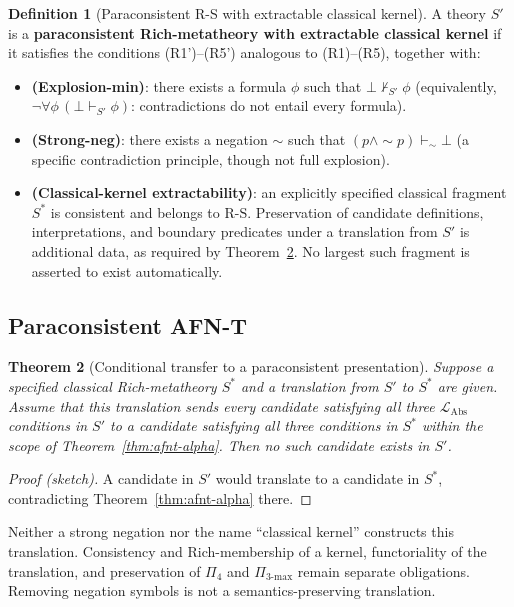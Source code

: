 \documentclass[11pt]{article}
\theoremstyle{plain}
\newtheorem{theorem}{Theorem}[section]
\theoremstyle{definition}
\newtheorem{definition}[theorem]{Definition}
\newcommand{\RS}{\mathrm{R\text{-}S}}
\newcommand{\LAbs}{\mathcal{L}_{\mathrm{Abs}}}
\begin{document}
\begin{definition}[Paraconsistent R-S with extractable classical kernel]\label{def:paraconsistent-rs}
A theory $S'$ is a \textbf{paraconsistent Rich-metatheory with extractable classical kernel} if it satisfies the conditions (R1')--(R5') analogous to (R1)--(R5), together with:
\begin{itemize}
\item \textbf{(Explosion-min)}: there exists a formula $\phi$ such that $\bot \not\vdash_{S'} \phi$ (equivalently, $\neg\forall\phi\,(\bot \vdash_{S'} \phi)$: contradictions do not entail every formula).
\item \textbf{(Strong-neg)}: there exists a negation $\sim$ such that $(p \wedge \sim p) \vdash_\sim \bot$ (a specific contradiction principle, though not full explosion).
\item \textbf{(Classical-kernel extractability)}: an explicitly specified classical fragment $S^*$ is consistent and belongs to $\RS$. Preservation of candidate definitions, interpretations, and boundary predicates under a translation from $S'$ is additional data, as required by Theorem~\ref{thm:paraconsistent-afnt}. No largest such fragment is asserted to exist automatically.
\end{itemize}
\end{definition}

\subsection{Paraconsistent AFN-T}

\begin{theorem}[Conditional transfer to a paraconsistent presentation]\label{thm:paraconsistent-afnt}
Suppose a specified classical Rich-metatheory $S^*$ and a translation from $S'$ to $S^*$ are given. Assume that this translation sends every candidate satisfying all three $\LAbs$ conditions in $S'$ to a candidate satisfying all three conditions in $S^*$ within the scope of Theorem~\ref{thm:afnt-alpha}. Then no such candidate exists in $S'$.
\end{theorem}
\begin{proof}[Proof (sketch)]
A candidate in $S'$ would translate to a candidate in $S^*$, contradicting Theorem~\ref{thm:afnt-alpha} there.
\end{proof}
Neither a strong negation nor the name ``classical kernel'' constructs this translation. Consistency and Rich-membership of a kernel, functoriality of the translation, and preservation of $\Pi_4$ and $\Pi_{3\text{-max}}$ remain separate obligations. Removing negation symbols is not a semantics-preserving translation.
\end{document}
